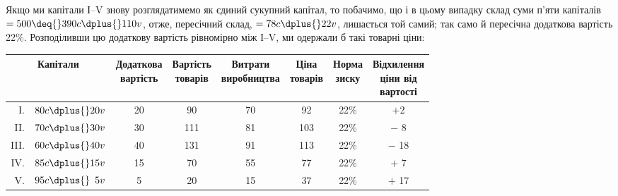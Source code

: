 
\noindent{}Якщо ми капітали І--V знову розглядатимемо як єдиний сукупний капітал, то побачимо, що і в цьому
випадку склад суми
п’яти капіталів $= 500 \deq{} 390 c \dplus{} 110 v$, отже, пересічний склад, $= 78 c \dplus{} 22 v$, лишається той самий;
так само й пересічна додаткова вартість \deq{} 22\%. Розподіливши цю додаткову вартість рівномірно між
І--V, ми одержали б такі товарні ціни:

\begin{table}[H]
\centering
\footnotesize
  \begin{tabular}{r@{ } c c c c c c c}
  \toprule
  \multicolumn{2}{c}{Капітали} &
  \makecell{Додаткова\\вартість} &
  \makecell{Вартість\\товарів} &
  \makecell{Витрати\\виробництва} &
  \makecell{Ціна\\товарів} &
  \makecell{Норма\\зиску} &
  \makecell{Відхилення\\ціни від\\вартості} \\
  \midrule
  \phantom{II}І. & $80 c \dplus{} 20 v$            & 20           & \phantom{0}90 & 70 &  \phantom{0}92 & 22\% & $+$\phantom{0}2 \\
  \phantom{I}II. & $70 c \dplus{} 30 v$            & 30           & 111           & 81 &  103           & 22\% & $-$ \phantom{0}8 \\
  III.           & $60 c \dplus{} 40 v$            & 40           & 131           & 91 &  113           & 22\% & $-$ 18 \\
  IV.            & $85 c \dplus{} 15 v$            & 15           & \phantom{0}70 & 55 & \phantom{0}77  & 22\% & $+$ \phantom{0}7 \\
  \phantom{I}V.  & $95 c \dplus{} \phantom{0}5 v $ & \phantom{0}5 & \phantom{0}20 & 15 & \phantom{0}37  & 22\% & $+$ 17 \\
  \end{tabular}
\end{table}

